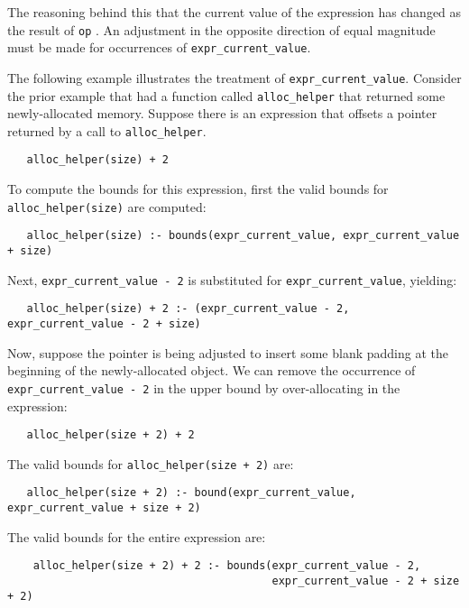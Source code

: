 The reasoning behind this that the current value of the expression has
changed as the result of \texttt{op} . An adjustment in the
opposite direction of equal magnitude must be made for occurrences of
\texttt{expr\_current\_value}.

The following example illustrates the treatment of
\texttt{expr\_current\_value}. Consider the prior example that had a
function called \texttt{alloc\_helper} that returned some
newly-allocated memory. Suppose there is an expression that offsets a
pointer returned by a call to \texttt{alloc\_helper}.

\begin{verbatim}
   alloc_helper(size) + 2
\end{verbatim}

To compute the bounds for this expression, first the valid bounds for
\texttt{alloc\_helper(size)} are computed:

\begin{verbatim}
   alloc_helper(size) :- bounds(expr_current_value, expr_current_value + size)
\end{verbatim}

Next, \texttt{expr\_current\_value - 2} is substituted for
\texttt{expr\_current\_value}, yielding:

\begin{verbatim}
   alloc_helper(size) + 2 :- (expr_current_value - 2, expr_current_value - 2 + size)
\end{verbatim}

Now, suppose the pointer is being adjusted to insert some blank padding
at the beginning of the newly-allocated object. We can remove the
occurrence of \texttt{expr\_current\_value - 2} in the upper bound by
over-allocating in the expression:

\begin{verbatim}
   alloc_helper(size + 2) + 2
\end{verbatim}

The valid bounds for \texttt{alloc\_helper(size + 2)} are:

\begin{verbatim}
   alloc_helper(size + 2) :- bound(expr_current_value, expr_current_value + size + 2)
\end{verbatim}

The valid bounds for the entire expression are:

\begin{verbatim}
    alloc_helper(size + 2) + 2 :- bounds(expr_current_value - 2,
                                         expr_current_value - 2 + size + 2)
\end{verbatim}

